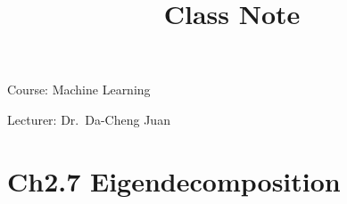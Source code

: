 \documentclass{article}
\begin{document}
\title{Class Note}
\Large{Course: Machine Learning}

\Large{Lecturer: Dr.\ Da-Cheng Juan}
%
%
\section{Ch2.7 Eigendecomposition}
\label{Ch2.7}

%
%
%
\end{document}
